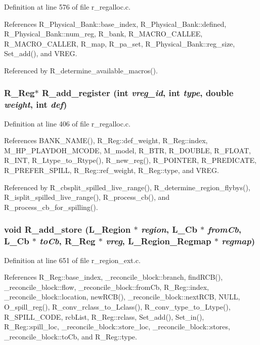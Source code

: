 Definition at line 576 of file r\_\-regalloc.c.

References R\_\-Physical\_\-Bank::base\_\-index, R\_\-Physical\_\-Bank::defined, R\_\-Physical\_\-Bank::num\_\-reg, R\_\-bank, R\_\-MACRO\_\-CALLEE, R\_\-MACRO\_\-CALLER, R\_\-map, R\_\-pa\_\-set, R\_\-Physical\_\-Bank::reg\_\-size, Set\_\-add(), and VREG.

Referenced by R\_\-determine\_\-available\_\-macros().
\subsubsection{\setlength{\rightskip}{0pt plus 5cm}\bf{R\_\-Reg}$\ast$ R\_\-add\_\-register (int {\em vreg\_\-id}, int {\em type}, double {\em weight}, int {\em def})}\label{r__regproto_8h_a5f0a31af36426f81ba06ef831aa0644}




Definition at line 406 of file r\_\-regalloc.c.

References BANK\_\-NAME(), R\_\-Reg::def\_\-weight, R\_\-Reg::index, M\_\-HP\_\-PLAYDOH\_\-MCODE, M\_\-model, R\_\-BTR, R\_\-DOUBLE, R\_\-FLOAT, R\_\-INT, R\_\-Ltype\_\-to\_\-Rtype(), R\_\-new\_\-reg(), R\_\-POINTER, R\_\-PREDICATE, R\_\-PREFER\_\-SPILL, R\_\-Reg::ref\_\-weight, R\_\-Reg::type, and VREG.

Referenced by R\_\-cbsplit\_\-spilled\_\-live\_\-range(), R\_\-determine\_\-region\_\-flybys(), R\_\-isplit\_\-spilled\_\-live\_\-range(), R\_\-process\_\-cb(), and R\_\-process\_\-cb\_\-for\_\-spilling().
\subsubsection{\setlength{\rightskip}{0pt plus 5cm}void R\_\-add\_\-store (L\_\-Region $\ast$ {\em region}, L\_\-Cb $\ast$ {\em from\-Cb}, L\_\-Cb $\ast$ {\em to\-Cb}, \bf{R\_\-Reg} $\ast$ {\em vreg}, L\_\-Region\_\-Regmap $\ast$ {\em regmap})}\label{r__regproto_8h_5176d106600ba33ed2174d2392857c5c}




Definition at line 651 of file r\_\-region\_\-ext.c.

References R\_\-Reg::base\_\-index, \_\-reconcile\_\-block::branch, find\-RCB(), \_\-reconcile\_\-block::flow, \_\-reconcile\_\-block::from\-Cb, R\_\-Reg::index, \_\-reconcile\_\-block::location, new\-RCB(), \_\-reconcile\_\-block::next\-RCB, NULL, O\_\-spill\_\-reg(), R\_\-conv\_\-rclass\_\-to\_\-Lclass(), R\_\-conv\_\-type\_\-to\_\-Ltype(), R\_\-SPILL\_\-CODE, rcb\-List, R\_\-Reg::rclass, Set\_\-add(), Set\_\-in(), R\_\-Reg::spill\_\-loc, \_\-reconcile\_\-block::store\_\-loc, \_\-reconcile\_\-block::stores, \_\-reconcile\_\-block::to\-Cb, and R\_\-Reg::type.

